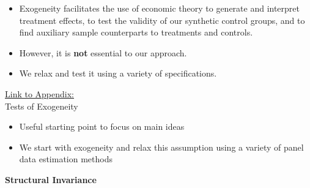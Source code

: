 \documentclass[static]{JJH-Beamer}
\begin{document}
\begin{frame}

\begin{itemize}
\item Exogeneity facilitates the use of economic theory to generate and interpret treatment effects, to test the validity of our synthetic control groups, and to find auxiliary sample counterparts to treatments and controls.
\item However, it is \textbf{not} essential to our approach.
\item We relax and test it using a variety of specifications.
\end{itemize}

\end{frame}

\begin{frame}

\hypertarget{ret:tarttarttart}{}
\begin{center}
\hyperlink{tarttarttart}{\underline{Link to Appendix:}}\\
\vspace{1.5mm}
Tests of Exogeneity
\end{center}

\end{frame}

\begin{frame}

\begin{itemize}
\item Useful starting point to focus on main ideas
\item We start with exogeneity and relax this assumption using a variety of panel data estimation methods
\end{itemize}

\end{frame}

\begin{frame}

\begin{center}
\textbf{Structural Invariance}
\end{center}

\end{frame}
\end{document}
